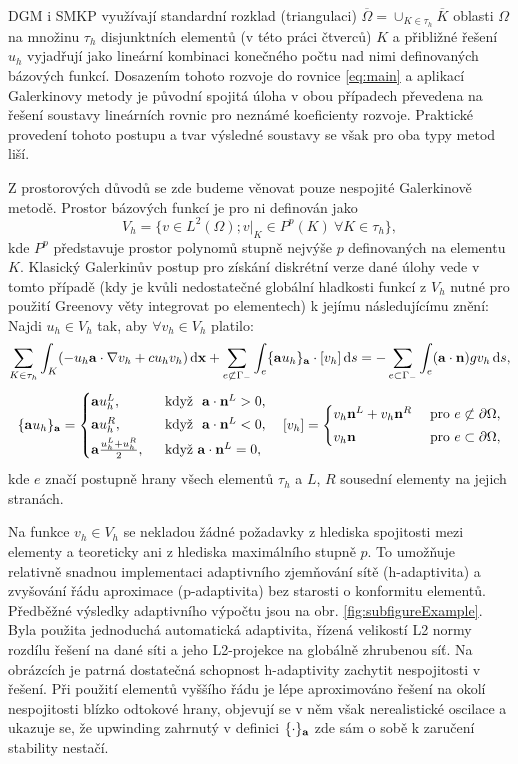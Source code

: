 \documentclass{sna}
\begin{document}
DGM i SMKP využívají standardní rozklad (triangulaci)
$
  \overline\Omega = \cup_{K\in\tau_h}\overline K
$
oblasti $\Omega$ na množinu $\tau_h$ disjunktních elementů (v této práci čtverců) $K$ a přibližné řešení $u_h$ vyjadřují jako lineární kombinaci konečného počtu nad nimi definovaných bázových funkcí. Dosazením tohoto rozvoje do rovnice \eqref{eq:main} a aplikací Galerkinovy metody je původní spojitá úloha v obou případech převedena na řešení soustavy lineárních rovnic pro neznámé koeficienty rozvoje. Praktické provedení tohoto postupu a tvar výsledné soustavy se však pro oba typy metod liší.  

Z prostorových důvodů se zde budeme věnovat pouze nespojité Galerkinově metodě. Prostor bázových funkcí je pro ni definován jako 
$$
  V_{h} = \{v\in L^2(\Omega); v\vert_K\in P^p(K)\ \forall K\in \tau_h\},
$$
kde $P^p$ představuje prostor polynomů stupně nejvýše $p$ definovaných na elementu $K$. 
Klasický Galerkinův postup pro získání diskrétní verze dané úlohy vede v tomto případě (kdy je kvůli nedostatečné globální hladkosti funkcí z $V_{h}$ nutné pro použití Greenovy věty integrovat po elementech) k jejímu následujícímu znění:
Najdi $u_{h}\in V_{h}$ tak, aby $\forall v_{h}\in V_{h}$ platilo:
$$
\begin{gathered}
  \sum_{K\in\tau_h}\int_{K} (-u_h \mathbf{a}\cdot \nabla v_h + c u_h v_h) \,\mathrm{d}\mathbf{x} + \sum_{e\not\subset\Gamma_-}\int_{e} \{\mathbf{a} u_h\}_{\mathbf{a}}\cdot[v_h] \,\mathrm{d}s = -\sum_{e\subset\Gamma_-}\int_{e} (\mathbf{a}\cdot\mathbf{n})g v_h \,\mathrm{d}s,\\[.3em]
  \{\mathbf{a} u_h\}_{\mathbf{a}} =
  \begin{cases}
    \mathbf{a} u_h^L, & \mbox{ když }\ \mathbf{a}\cdot\mathbf{n}^L > 0,\\[.25em]
    \mathbf{a} u_h^R, & \mbox{ když }\ \mathbf{a}\cdot\mathbf{n}^L < 0,\\[.25em]
    \mathbf{a} \frac{u_h^L + u_h^R}{2},\ & \mbox{ když } \mathbf{a}\cdot\mathbf{n}^L = 0,
   \end{cases}\quad
   [v_h] = 
   \begin{cases}
    v_h\mathbf{n}^L + v_h\mathbf{n}^R & \mbox{ pro } e \not\subset\partial\Omega,\\[.25em]
    v_h\mathbf{n} & \mbox{ pro } e \subset\partial\Omega,
   \end{cases}
\end{gathered}
$$
kde $e$ značí postupně hrany všech elementů $\tau_h$ a $L$, $R$ sousední elementy na jejich stranách.

Na funkce $v_{h}\in V_{h}$ se nekladou žádné požadavky z hlediska spojitosti mezi elementy a teoreticky ani z hlediska maximálního stupně $p$. To umožňuje relativně snadnou implementaci adaptivního zjemňování sítě (h-adaptivita) a zvyšování řádu aproximace (p-adaptivita) bez starosti o konformitu elementů. Předběžné výsledky adaptivního výpočtu jsou na obr. \ref{fig:subfigureExample}. Byla použita jednoduchá automatická adaptivita, řízená velikostí L2 normy rozdílu řešení na dané síti a jeho L2-projekce na globálně zhrubenou síť. Na obrázcích je patrná dostatečná schopnost h-adaptivity zachytit nespojitosti v řešení. Při použití elementů vyššího řádu je lépe aproximováno řešení na okolí nespojitosti blízko odtokové hrany, objevují se v něm však nerealistické oscilace a ukazuje se, že upwinding zahrnutý v definici $\{\cdot\}_{\mathbf{a}}$ zde sám o sobě k zaručení stability nestačí.
\end{document}
